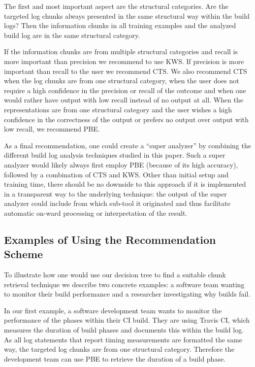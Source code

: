 The first and most important aspect are the structural categories.
Are the targeted log chunks always presented in
the same structural way within the build logs? Then the information
chunks in all training examples and the analyzed build log are in the
same structural category.

If the information chunks are from multiple structural categories
and recall is more important than precision we recommend
to use KWS\@.
If precision is more important than recall to the user we
recommend CTS\@.
We also recommend CTS when the log chunks are
from one structural category, when the user does not require a high
confidence in the precision or recall of the outcome and when one
would rather have output with low recall instead of no output at all.
When the representations are from one structural category and the user
wishes a high confidence in the correctness of the output or prefers
no output over output with low recall, we recommend PBE\@.

As a final recommendation, one could create a ``super analyzer'' by
combining the different build log analysis techniques studied in this
paper.
Such a super analyzer would likely always first employ PBE
(because of its high accuracy), followed by a combination of CTS and
KWS\@.
Other than initial setup and training time, there should be no
downside to this approach if it is implemented in a transparent way to
the underlying technique: the output of the super analyzer could
include from which sub-tool it originated and thus facilitate
automatic on-ward processing or interpretation of the result.


\subsection{Examples of Using the Recommendation Scheme}
To illustrate how one would use our decision tree to find a suitable
chunk retrieval technique we describe two concrete examples: a software
team
wanting to monitor their build performance and a
researcher investigating why builds fail.

In our first example, a software development team wants to monitor
the performance of the phases within their CI build.
They are using
Travis CI, which measures the duration of build phases and documents
this within the build log.
As all log statements that report timing
measurements are formatted the same way, the targeted log chunks are
from one structural category.
Therefore the development team can use
PBE to retrieve the duration of a build phase.

